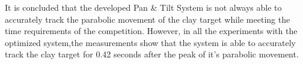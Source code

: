 It is concluded that the developed Pan \& Tilt System
is not always able to accurately track the parabolic movement of the clay target while
meeting the time requirements of the competition.
However, in all the experiments with the optimized system,the measurements show
that the system is able to accurately track the
clay target for 0.42 seconds after the peak of it's parabolic movement.

